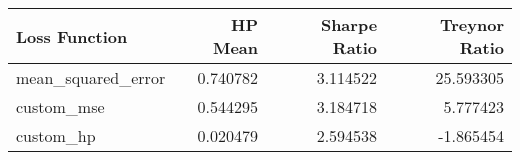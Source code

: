 \begin{tabular}{lrrr}
\toprule
     Loss Function &  HP Mean &  Sharpe Ratio &  Treynor Ratio \\
\midrule
mean\_squared\_error & 0.740782 &      3.114522 &      25.593305 \\
        custom\_mse & 0.544295 &      3.184718 &       5.777423 \\
         custom\_hp & 0.020479 &      2.594538 &      -1.865454 \\
\bottomrule
\end{tabular}

